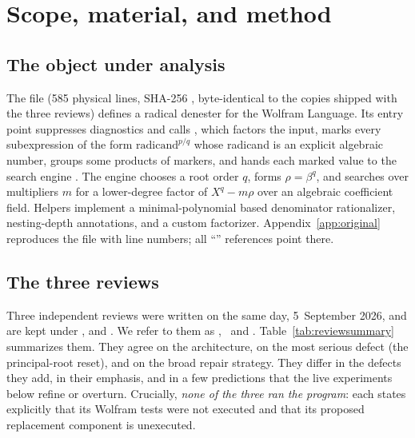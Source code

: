 \section{Scope, material, and method}
\label{sec:intro}

\subsection{The object under analysis}
The file  (585 physical lines, SHA-256
, byte-identical to the copies shipped with the three
reviews) defines a radical denester for the Wolfram Language. Its entry point
 suppresses diagnostics and calls , which
factors the input, marks every subexpression of the form
$\text{radicand}^{p/q}$ whose radicand is an explicit algebraic number, groups
some products of markers, and hands each marked value to the search engine
. The engine chooses a root order $q$, forms $\rho=\beta^q$, and
searches over multipliers $m$ for a lower-degree factor of $X^q-m\rho$ over an
algebraic coefficient field. Helpers implement a minimal-polynomial based
denominator rationalizer, nesting-depth annotations, and a custom factorizer.
Appendix~\ref{app:original} reproduces the file with line numbers; all
``'' references point there.

\subsection{The three reviews}
Three independent reviews were written on the same day, 5~September 2026, and
are kept under ,  and . We
refer to them as \RI, \RII\ and \RIII. Table~\ref{tab:reviewsummary}
summarizes them. They agree on the architecture, on the most serious defect
(the principal-root reset), and on the broad repair strategy. They differ in the
defects they add, in their emphasis, and in a few predictions that the live
experiments below refine or overturn. Crucially, \emph{none of the three ran
the program}: each states explicitly that its Wolfram tests were not executed
and that its proposed replacement component is unexecuted.

